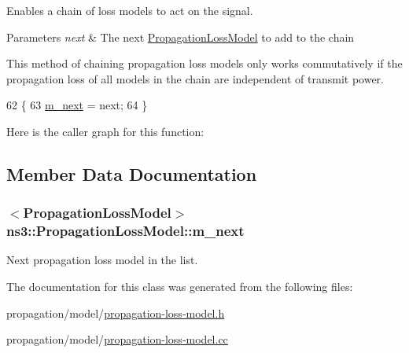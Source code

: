 Enables a chain of loss models to act on the signal. 


\begin{DoxyParams}{Parameters}
{\em next} & The next \hyperlink{classns3_1_1PropagationLossModel}{Propagation\+Loss\+Model} to add to the chain\\
\hline
\end{DoxyParams}
This method of chaining propagation loss models only works commutatively if the propagation loss of all models in the chain are independent of transmit power. 
\begin{DoxyCode}
62 \{
63   \hyperlink{classns3_1_1PropagationLossModel_a8f8a6cde61bb8e7640bb163db1cc074b}{m\_next} = next;
64 \}
\end{DoxyCode}


Here is the caller graph for this function\+:




\subsection{Member Data Documentation}
\subsubsection[{\texorpdfstring{m\+\_\+next}{m_next}}]{$<${\bf Propagation\+Loss\+Model}$>$ ns3\+::\+Propagation\+Loss\+Model\+::m\+\_\+next\hspace{0.3cm}{\ttfamily [private]}}\hypertarget{classns3_1_1PropagationLossModel_a8f8a6cde61bb8e7640bb163db1cc074b}{}\label{classns3_1_1PropagationLossModel_a8f8a6cde61bb8e7640bb163db1cc074b}


Next propagation loss model in the list. 



The documentation for this class was generated from the following files\+:\begin{DoxyCompactItemize}
\item 
propagation/model/\hyperlink{propagation-loss-model_8h}{propagation-\/loss-\/model.\+h}\item 
propagation/model/\hyperlink{propagation-loss-model_8cc}{propagation-\/loss-\/model.\+cc}\end{DoxyCompactItemize}
